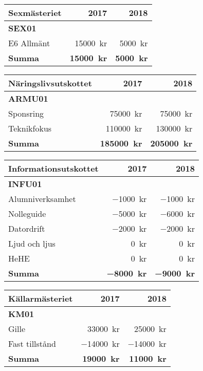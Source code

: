 \documentclass[10pt]{article}
\begin{document}
\begin{tabularx}{10cm}{X r r}
    \textbf{\large Sexmästeriet} & \textbf{2017} & \textbf{2018} \\
    \hline
    \textbf{SEX01} \\
    E6 Allmänt & \SI{15000}{kr} & \SI{5000}{kr} \\
    \hline
    \textbf{Summa} & \textbf{\SI{15000}{kr}} & \textbf{\SI{5000}{kr}} \\
\end{tabularx}

\begin{tabularx}{10cm}{X r r}
    \textbf{\large Näringslivsutskottet} & \textbf{2017} & \textbf{2018} \\
    \hline
    \textbf{ARMU01} \\
    Sponsring & \SI{75000}{kr} & \SI{75000}{kr} \\
    Teknikfokus & \SI{110000}{kr} & \SI{130000}{kr} \\
    \hline
    \textbf{Summa} & \textbf{\SI{185000}{kr}} & \textbf{\SI{205000}{kr}} \\
\end{tabularx}

\begin{tabularx}{10cm}{X r r}
    \textbf{\large Informationsutskottet} & \textbf{2017} & \textbf{2018} \\
    \hline
    \textbf{INFU01} \\
    Alumniverksamhet & \SI{-1000}{kr} & \SI{-1000}{kr} \\
    Nolleguide & \SI{-5000}{kr} & \SI{-6000}{kr} \\
    Datordrift & \SI{-2000}{kr} & \SI{-2000}{kr} \\
    Ljud och ljus & \SI{0}{kr} & \SI{0}{kr} \\
    HeHE & \SI{0}{kr} & \SI{0}{kr} \\
    \hline
    \textbf{Summa} & \textbf{\SI{-8000}{kr}} & \textbf{\SI{-9000}{kr}} \\
\end{tabularx}

\begin{tabularx}{10cm}{X r r}
    \textbf{\large Källarmästeriet} & \textbf{2017} & \textbf{2018} \\
    \hline
    \textbf{KM01} \\
    Gille & \SI{33000}{kr} & \SI{25000}{kr} \\
    Fast tillstånd & \SI{-14000}{kr} & \SI{-14000}{kr} \\
    \hline
    \textbf{Summa} & \textbf{\SI{19000}{kr}} & \textbf{\SI{11000}{kr}} \\
\end{tabularx}
\end{document}
